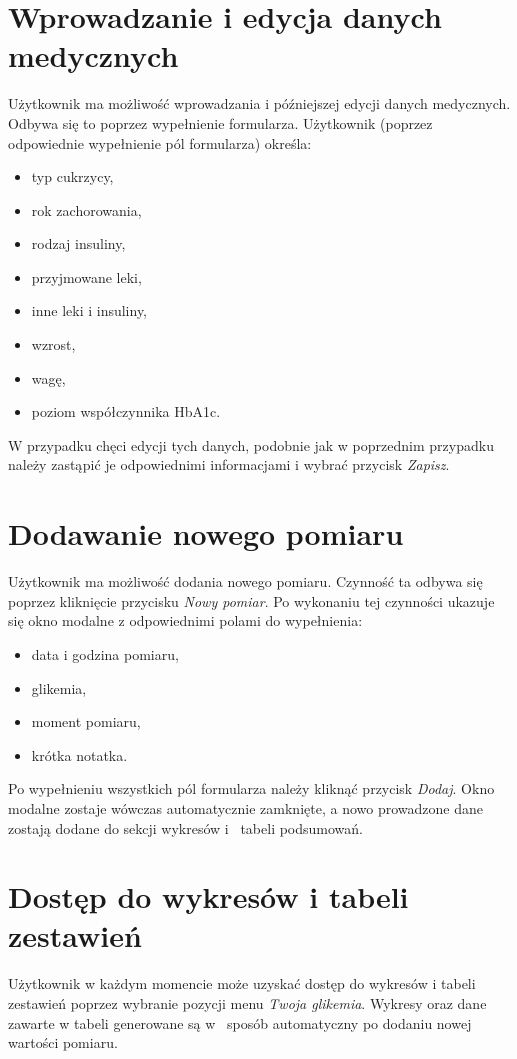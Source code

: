 \section{Wprowadzanie i edycja danych medycznych}
Użytkownik ma możliwość wprowadzania i późniejszej edycji danych medycznych. Odbywa się to poprzez wypełnienie formularza. Użytkownik (poprzez odpowiednie wypełnienie pól formularza) określa: 
\begin{itemize}
	\item typ cukrzycy,
	\item rok zachorowania,
	\item rodzaj insuliny,
	\item przyjmowane leki,
	\item inne leki i insuliny,
	\item wzrost,
	\item wagę,
	\item poziom współczynnika HbA1c.
\end{itemize}
W przypadku chęci edycji tych danych, podobnie jak w poprzednim przypadku należy zastąpić je odpowiednimi informacjami i wybrać przycisk \textit{Zapisz}.

\section{Dodawanie nowego pomiaru}
Użytkownik ma możliwość dodania nowego pomiaru. Czynność ta odbywa się poprzez kliknięcie przycisku \textit{Nowy pomiar}. Po wykonaniu tej czynności ukazuje się okno modalne z odpowiednimi polami do wypełnienia:
\begin{itemize}
	\item data i godzina pomiaru,
	\item glikemia,
	\item moment pomiaru,
	\item krótka notatka.
\end{itemize}
Po wypełnieniu wszystkich pól formularza należy kliknąć przycisk \textit{Dodaj}. Okno modalne zostaje wówczas automatycznie zamknięte, a nowo prowadzone dane zostają dodane do sekcji wykresów i~ tabeli podsumowań. 

\section{Dostęp do wykresów i tabeli zestawień}
Użytkownik w każdym momencie może uzyskać dostęp do wykresów i tabeli zestawień poprzez wybranie pozycji menu \textit{Twoja glikemia}. Wykresy oraz dane zawarte w tabeli generowane są w~ sposób automatyczny po dodaniu nowej wartości pomiaru. 

